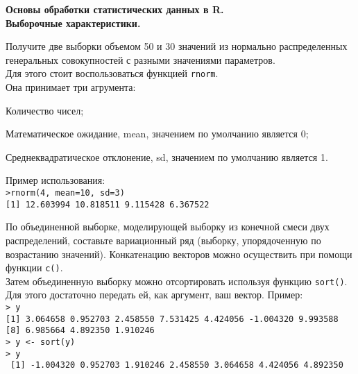 		\renewenvironment{itemize}{
			\begin{list}{\labelitemi}{
				\setlength{\topsep}{0pt}
				\setlength{\partopsep}{0pt}
				\setlength{\parskip}{0pt}
				\setlength{\itemsep}{0pt}
				\setlength{\parsep}{0pt}
			}
		}
		{\end{list}}
\textbf{Основы обработки статистических данных в R. \\ \indent Выборочные характеристики.}
\begin{enumerate}
	\item Получите две выборки объемом 50 и 30 значений из нормально распределенных генеральных совокупностей с разными значениями параметров.\\
		Для этого стоит воспользоваться функцией \texttt{rnorm}.\\
		Она принимает три агрумента:
		\begin{itemize}
			\item[--] Количество чисел;
			\item[--] Математическое ожидание, mean, значением по умолчанию является 0; 
			\item[--] Среднеквадратическое отклонение, sd, значением по умолчанию является 1.
		\end{itemize} 
		Пример использования:\\
		\indent \texttt{>rnorm(4, mean=10, sd=3)}\\
		\indent \texttt{[1] 12.603994 10.818511  9.115428  6.367522}
	\item По объединенной выборке, моделирующей выборку из конечной смеси двух распределений, 
		составьте вариационный ряд (выборку, упорядоченную по возрастанию значений).
		Конкатенацию векторов можно осуществить при помощи функции \texttt{c()}.\\
		Затем объединенную выборку можно отсортировать используя функцию \texttt{sort()}. 
		Для этого достаточно передать ей, как аргумент, ваш вектор. Пример:\\
		\indent \texttt{> y} \\
 		\indent \texttt{[1]  3.064658  0.952703  2.458550  7.531425  4.424056 -1.004320  9.993588} \\
 		\indent \texttt{[8]  6.985664  4.892350  1.910246} \\
        \indent \texttt{> y <- sort(y)} \\
		\indent \texttt{> y} \\
		\indent \texttt{ [1] -1.004320  0.952703  1.910246  2.458550  3.064658  4.424056  4.892350} \\

\end{enumerate}
